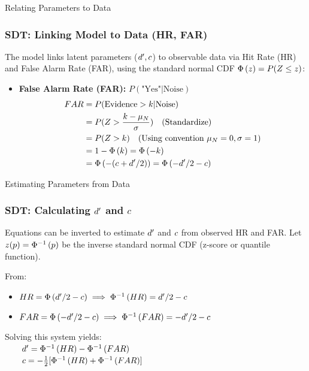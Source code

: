 \documentclass[aspectratio=169]{beamer}
\begin{document}
\begin{frame}{Relating Parameters to Data}
    \frametitle{SDT: Linking Model to Data (HR, FAR)}
    The model links latent parameters ($d', c$) to observable data via Hit Rate (HR) and False Alarm Rate (FAR), using the standard normal CDF $\Phi\left(z\right) = P(Z \le z)$:
    \begin{itemize}
      \item \textbf{False Alarm Rate (FAR):} $P(\text{"Yes"} | \text{Noise})$
      \begin{align*}
        FAR &= P(\text{Evidence} > k | \text{Noise}) \\
            &= P(Z > \frac{k - \mu_N}{\sigma}) \quad \text{(Standardize)}\\
            &= P(Z > k) \quad \text{(Using convention $\mu_N=0, \sigma=1$)}\\
            &= 1 - \Phi\left(k\right) = \Phi\left(-k\right) \\
            &= \Phi\left(-(c + d'/2)\right) = \Phi\left(-d'/2 - c\right)
      \end{align*}
    \end{itemize}
\end{frame}


\begin{frame}{Estimating Parameters from Data}
  \frametitle{SDT: Calculating $d'$ and $c$}
  Equations can be inverted to estimate $d'$ and $c$ from observed HR and FAR.
  \pause
  Let $z(p) = \Phi^{-1}\left(p\right)$ be the inverse standard normal CDF (z-score or quantile function).
  \pause

  From:
  \begin{itemize}
      \item $HR = \Phi\left(d'/2 - c\right) \implies \Phi^{-1}\left(HR\right) = d'/2 - c$
      \item $FAR = \Phi\left(-d'/2 - c\right) \implies \Phi^{-1}\left(FAR\right) = -d'/2 - c$
  \end{itemize}
  \pause
  Solving this system yields:
  \\[2ex]
  $ \qquad d' = \Phi^{-1}\left(HR\right) - \Phi^{-1}\left(FAR\right) $
  \\[2ex]
  $ \qquad c = -\frac{1}{2} [\Phi^{-1}\left(HR\right) + \Phi^{-1}\left(FAR\right)] $
\end{frame}
\end{document}
